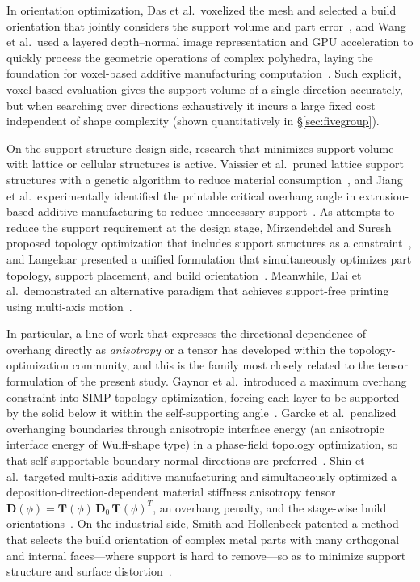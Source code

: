 \documentclass[11pt,a4paper]{article}
\begin{document}
In orientation optimization, Das et al.\ voxelized the mesh and selected a build orientation that jointly considers the support volume and part error~\cite{das2017},
and Wang et al.\ used a layered depth--normal image representation and GPU acceleration to quickly process the geometric operations of complex polyhedra,
laying the foundation for voxel-based additive manufacturing computation~\cite{wang2010}.
Such explicit, voxel-based evaluation gives the support volume of a single direction accurately,
but when searching over directions exhaustively it incurs a large fixed cost independent of shape complexity
(shown quantitatively in \S\ref{sec:fivegroup}).

On the support structure design side, research that minimizes support volume with lattice or cellular structures is active.
Vaissier et al.\ pruned lattice support structures with a genetic algorithm to reduce material consumption~\cite{vaissier2019},
and Jiang et al.\ experimentally identified the printable critical overhang angle in extrusion-based additive manufacturing
to reduce unnecessary support~\cite{jiang2018}.
As attempts to reduce the support requirement at the design stage, Mirzendehdel and Suresh proposed topology optimization
that includes support structures as a constraint~\cite{mirzendehdel2016}, and Langelaar presented a unified formulation that simultaneously optimizes
part topology, support placement, and build orientation~\cite{langelaar2018}.
Meanwhile, Dai et al.\ demonstrated an alternative paradigm that achieves support-free printing using multi-axis motion~\cite{dai2018}.

In particular, a line of work that expresses the directional dependence of overhang directly as \emph{anisotropy} or a tensor
has developed within the topology-optimization community, and this is the family most closely related to the tensor formulation of the present study.
Gaynor et al.\ introduced a maximum overhang constraint into SIMP topology optimization, forcing each layer to be supported by the solid below it
within the self-supporting angle~\cite{gaynor2014}.
Garcke et al.\ penalized overhanging boundaries through anisotropic interface energy (an anisotropic interface energy of Wulff-shape type)
in a phase-field topology optimization, so that self-supportable boundary-normal directions are preferred~\cite{garcke2023}.
Shin et al.\ targeted multi-axis additive manufacturing and simultaneously optimized a deposition-direction-dependent material stiffness anisotropy tensor
$\mathbf{D}(\phi)=\mathbf{T}(\phi)\,\mathbf{D}_0\,\mathbf{T}(\phi)^T$, an overhang penalty, and the stage-wise build orientations~\cite{shin2025}.
On the industrial side, Smith and Hollenbeck patented a method that selects the build orientation of complex metal parts
with many orthogonal and internal faces---where support is hard to remove---so as to minimize support structure and surface distortion~\cite{smith2025patent}.
\end{document}
